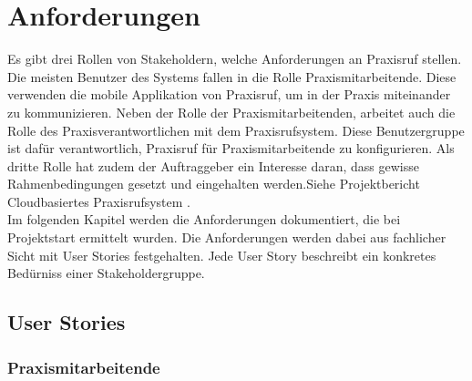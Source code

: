 \section{Anforderungen}\label{sec:anforderungen}

Es gibt drei Rollen von Stakeholdern, welche Anforderungen an Praxisruf stellen.
Die meisten Benutzer des Systems fallen in die Rolle Praxismitarbeitende.
Diese verwenden die mobile Applikation von Praxisruf, um in der Praxis miteinander zu kommunizieren.
Neben der Rolle der Praxismitarbeitenden, arbeitet auch die Rolle des Praxisverantwortlichen mit dem Praxisrufsystem.
Diese Benutzergruppe ist dafür verantwortlich, Praxisruf für Praxismitarbeitende zu konfigurieren.
Als dritte Rolle hat zudem der Auftraggeber ein Interesse daran, dass gewisse Rahmenbedingungen gesetzt und eingehalten werden.{Siehe Projektbericht Cloudbasiertes Praxisrufsystem \cite{ip5}}. \\

Im folgenden Kapitel werden die Anforderungen dokumentiert, die bei Projektstart ermittelt wurden.
Die Anforderungen werden dabei aus fachlicher Sicht mit User Stories festgehalten.
Jede User Story beschreibt ein konkretes Bedürniss einer Stakeholdergruppe.

\subsection*{User Stories}

\subsubsection*{Praxismitarbeitende}

